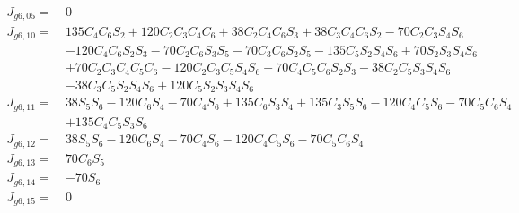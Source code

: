 \documentclass[12pt]{article}
\begin{document}
\begin{CJK}{UTF8}{bsmi}
\begin{equation*}
\begin{split}
J_{g6,05} =\  &0\\
J_{g6,10} =\  &135C_4C_6S_2 + 120C_2C_3C_4C_6 + 38C_2C_4C_6S_3 + 38C_3C_4C_6S_2 - 70C_2C_3S_4S_6\\
			  & - 120C_4C_6S_2S_3 - 70C_2C_6S_3S_5 - 70C_3C_6S_2S_5 - 135C_5S_2S_4S_6 + 70S_2S_3S_4S_6\\
			  & + 70C_2C_3C_4C_5C_6 - 120C_2C_3C_5S_4S_6 - 70C_4C_5C_6S_2S_3 - 38C_2C_5S_3S_4S_6\\
			  & - 38C_3C_5S_2S_4S_6 + 120C_5S_2S_3S_4S_6\\
J_{g6,11} =\  &38S_5S_6 - 120C_6S_4 - 70C_4S_6 + 135C_6S_3S_4 + 135C_3S_5S_6 - 120C_4C_5S_6 - 70C_5C_6S_4\\
			  & + 135C_4C_5S_3S_6\\
J_{g6,12} =\  &38S_5S_6 - 120C_6S_4 - 70C_4S_6 - 120C_4C_5S_6 - 70C_5C_6S_4\\
J_{g6,13} =\  &70C_6S_5\\
J_{g6,14} =\  &-70S_6\\
J_{g6,15} =\  &0\\
\end{split}
\end{equation*}

\end{CJK}
\end{document}
